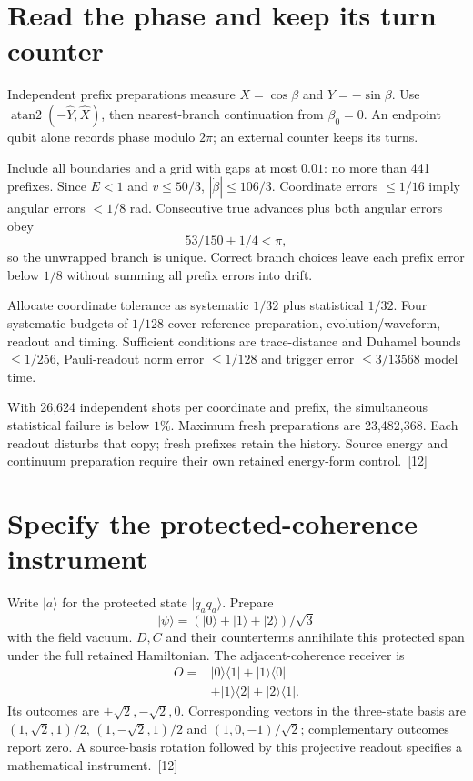 \documentclass[10pt,twocolumn,letterpaper]{article}
\begin{document}
\section{Read the phase and keep its turn counter}
Independent prefix preparations measure $X=\cos\beta$ and $Y=-\sin\beta$. Use $\operatorname{atan2}(-\widehat Y,\widehat X)$, then nearest-branch continuation from $\beta_0=0$. An endpoint qubit alone records phase modulo $2\pi$; an external counter keeps its turns.

Include all boundaries and a grid with gaps at most $0.01$: no more than 441 prefixes. Since $E<1$ and $v\leq50/3$, $|\dot\beta|\leq106/3$. Coordinate errors $\leq1/16$ imply angular errors $<1/8$ rad. Consecutive true advances plus both angular errors obey
\[
53/150+1/4<\pi,
\]
so the unwrapped branch is unique. Correct branch choices leave each prefix error below $1/8$ without summing all prefix errors into drift.

Allocate coordinate tolerance as systematic $1/32$ plus statistical $1/32$. Four systematic budgets of $1/128$ cover reference preparation, evolution/waveform, readout and timing. Sufficient conditions are trace-distance and Duhamel bounds $\leq1/256$, Pauli-readout norm error $\leq1/128$ and trigger error $\leq3/13568$ model time.

With 26,624 independent shots per coordinate and prefix, the simultaneous statistical failure is below $1\%$. Maximum fresh preparations are 23,482,368. Each readout disturbs that copy; fresh prefixes retain the history. Source energy and continuum preparation require their own retained energy-form control.~[12]

\section{Specify the protected-coherence instrument}
Write $\lvert a\rangle$ for the protected state $\lvert q_a q_a\rangle$. Prepare
\[
\lvert\psi\rangle=(\lvert0\rangle+\lvert1\rangle+\lvert2\rangle)/\sqrt3
\]
with the field vacuum. $D,C$ and their counterterms annihilate this protected span under the full retained Hamiltonian. The adjacent-coherence receiver is
\[
\begin{aligned}
O={}&\lvert0\rangle\langle1\rvert+\lvert1\rangle\langle0\rvert\\
&+\lvert1\rangle\langle2\rvert+\lvert2\rangle\langle1\rvert.
\end{aligned}
\]
Its outcomes are $+\sqrt2,-\sqrt2,0$. Corresponding vectors in the three-state basis are $(1,\sqrt2,1)/2$, $(1,-\sqrt2,1)/2$ and $(1,0,-1)/\sqrt2$; complementary outcomes report zero. A source-basis rotation followed by this projective readout specifies a mathematical instrument.~[12]
\end{document}

